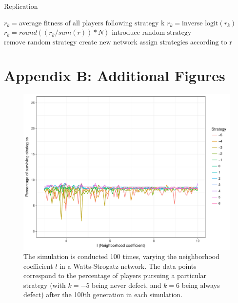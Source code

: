 \documentclass{JASSS}
\begin{document}
\begin{algorithm}
	\caption{Replication}
	\label{Algorithm4}
	\begin{algorithmic}[1]
		\State $r_k=\text{average fitness of all players following strategy k}$
		\State $r_k=\text{inverse logit}(r_k)$
		\EndFor
		\State $r_k=round((r_{k}/sum(r))*N)$
		\EndFor
		\State $\text{introduce random strategy}$
		\EndWhile
		\State $\text{remove random strategy}$
		\EndWhile
		\State $\text{create new network}$
		\State $\text{assign strategies according to r}$
		\EndFunction
	\end{algorithmic}
\end{algorithm}

\FloatBarrier

\section{Appendix B: Additional Figures}
\begin{figure}
	\centering
	\includegraphics[width=\linewidth]{./figures/results_WS_300_nei_100sims.pdf}
	\caption{The simulation is conducted 100 times, varying the neighborhood coefficient $l$ in a Watts-Strogatz network. The data points correspond to the percentage of players pursuing a particular strategy (with $k=-5$ being never defect, and $k=6$ being always defect) after the 100th generation in each simulation.}
	\label{WS_300_l_100sims}
\end{figure}
\end{document}

